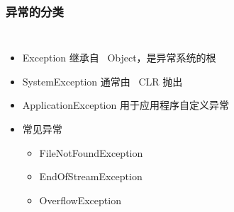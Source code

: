 
\begin{frame}
\frametitle{异常的分类}
\begin{columns}
  \begin{itemize}
  \item Exception 继承自 ~Object，是异常系统的根
  \item SystemException 通常由 ~CLR 抛出
  \item ApplicationException 用于应用程序自定义异常
  \item 常见异常
    \begin{itemize}
    \item FileNotFoundException
    \item EndOfStreamException
    \item OverflowException
    \end{itemize}
  \end{itemize}
  
\end{columns}
\end{frame}

